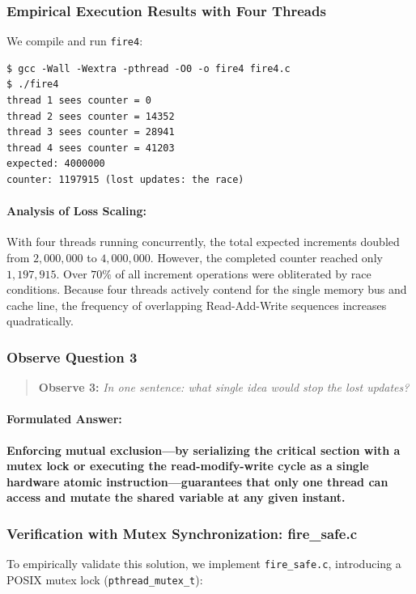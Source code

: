 \documentclass{labreport}
\begin{document}
\subsubsection{Empirical Execution Results with Four Threads}
We compile and run \texttt{fire4}:

\begin{lstlisting}[style=bash]
$ gcc -Wall -Wextra -pthread -O0 -o fire4 fire4.c
$ ./fire4
thread 1 sees counter = 0
thread 2 sees counter = 14352
thread 3 sees counter = 28941
thread 4 sees counter = 41203
expected: 4000000
counter: 1197915 (lost updates: the race)
\end{lstlisting}

\paragraph{Analysis of Loss Scaling:}
With four threads running concurrently, the total expected increments doubled from $2{,}000{,}000$ to $4{,}000{,}000$. However, the completed counter reached only $1{,}197{,}915$. Over $70\%$ of all increment operations were obliterated by race conditions. Because four threads actively contend for the single memory bus and cache line, the frequency of overlapping Read-Add-Write sequences increases quadratically.

\subsubsection{Observe Question 3}
\begin{quote}
\textbf{Observe 3:} \textit{In one sentence: what single idea would stop the lost updates?}
\end{quote}

\paragraph{Formulated Answer:}
\textbf{Enforcing mutual exclusion—by serializing the critical section with a mutex lock or executing the read-modify-write cycle as a single hardware atomic instruction—guarantees that only one thread can access and mutate the shared variable at any given instant.}

\subsubsection{Verification with Mutex Synchronization: fire\_safe.c}
To empirically validate this solution, we implement \texttt{fire\_safe.c}, introducing a POSIX mutex lock (\texttt{pthread\_mutex\_t}):
\end{document}
